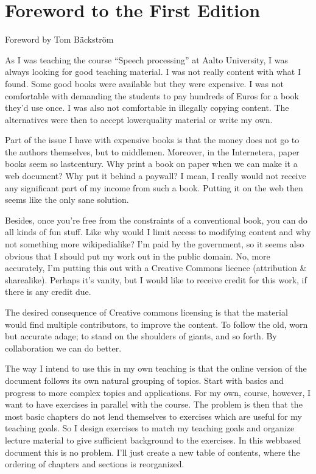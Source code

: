 \documentclass[letterpaper,10pt,english]{jupyterBook}
\begin{document}
\section{Foreword to the First Edition}
\label{\detokenize{Preface:foreword-to-the-first-edition}}
\sphinxAtStartPar
Foreword by Tom Bäckström

\sphinxAtStartPar
As I was teaching the course “Speech processing” at Aalto University, I
was always looking for good teaching material. I was not really content
with what I found. Some good books were available but they were
expensive. I was not comfortable with demanding the students to pay
hundreds of Euros for a book they’d use once. I was also not comfortable
in illegally copying content. The alternatives were then to accept
lower\sphinxhyphen{}quality material or write my own.

\sphinxAtStartPar
Part of the issue I have with expensive books is that the money does not
go to the authors themselves, but to middle\sphinxhyphen{}men. Moreover, in the
Internet\sphinxhyphen{}era, paper books seem so last\sphinxhyphen{}century. Why print a book on
paper when we can make it a web document? Why put it behind a pay\sphinxhyphen{}wall?
I mean, I really would not receive any significant part of my income
from such a book. Putting it on the web then seems like the only sane
solution.

\sphinxAtStartPar
Besides, once you’re free from the constraints of a conventional book,
you can do all kinds of fun stuff. Like why would I limit access to
modifying content and why not something more wikipedia\sphinxhyphen{}like? I’m paid by
the government, so it seems also obvious that I should put my work out
in the public domain. No, more accurately, I’m putting this out with a
Creative Commons licence (attribution \& share\sphinxhyphen{}alike). Perhaps it’s
vanity, but I would like to receive credit for this work, if there is
any credit due.

\sphinxAtStartPar
The desired consequence of Creative commons licensing is that the
material would find multiple contributors, to improve the content. To
follow the old, worn but accurate adage; to stand on the shoulders of
giants, and so forth. By collaboration we can do better.

\sphinxAtStartPar
The way I intend to use this in my own teaching is that the on\sphinxhyphen{}line
version of the document follows its own natural grouping of topics.
Start with basics and progress to more complex topics and applications.
For my own, course, however, I want to have exercises in parallel with
the course. The problem is then that the most basic chapters do not lend
themselves to exercises which are useful for my teaching goals. So I
design exercises to match my teaching goals and organize lecture
material to give sufficient background to the exercises. In this
web\sphinxhyphen{}based document this is no problem. I’ll just create a new table of
contents, where the ordering of chapters and sections is reorganized.
\end{document}

